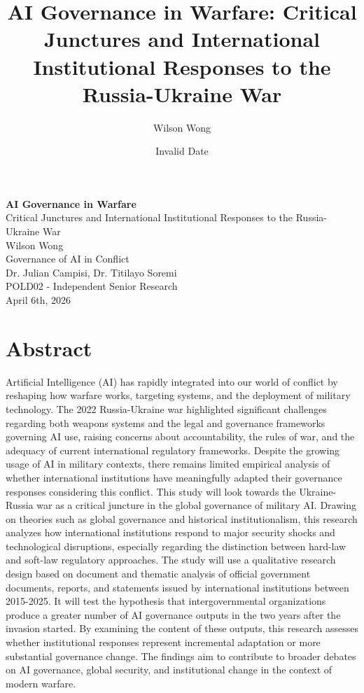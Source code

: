\documentclass[
  12pt,
]{article}
\title{AI Governance in Warfare: Critical Junctures and International
Institutional Responses to the Russia-Ukraine War}
\author{Wilson Wong}
\date{Invalid Date}
\renewcommand*\contentsname{Table of contents}
\newcommand\contentsname{Table of contents}
\begin{document}
\maketitle

\renewcommand*\contentsname{Table of Contents}
{
\hypersetup{linkcolor=}
\setcounter{tocdepth}{3}
\tableofcontents
}
\newpage
\begin{center}
\vspace*{2in}
{\Large\textbf{AI Governance in Warfare}}\\
\vspace{0.5cm}
{\large Critical Junctures and International Institutional Responses to the Russia-Ukraine War}\\
\vspace{1.5cm}
{\large Wilson Wong}\\
\vspace{1cm}
Governance of AI in Conflict\\
Dr. Julian Campisi, Dr. Titilayo Soremi\\
POLD02 - Independent Senior Research\\
\vspace{1cm}
April 6th, 2026
\end{center}
\newpage

\section{Abstract}\label{abstract}

Artificial Intelligence (AI) has rapidly integrated into our world of
conflict by reshaping how warfare works, targeting systems, and the
deployment of military technology. The 2022 Russia-Ukraine war
highlighted significant challenges regarding both weapons systems and
the legal and governance frameworks governing AI use, raising concerns
about accountability, the rules of war, and the adequacy of current
international regulatory frameworks. Despite the growing usage of AI in
military contexts, there remains limited empirical analysis of whether
international institutions have meaningfully adapted their governance
responses considering this conflict. This study will look towards the
Ukraine-Russia war as a critical juncture in the global governance of
military AI. Drawing on theories such as global governance and
historical institutionalism, this research analyzes how international
institutions respond to major security shocks and technological
disruptions, especially regarding the distinction between hard-law and
soft-law regulatory approaches. The study will use a qualitative
research design based on document and thematic analysis of official
government documents, reports, and statements issued by international
institutions between 2015-2025. It will test the hypothesis that
intergovernmental organizations produce a greater number of AI
governance outputs in the two years after the invasion started. By
examining the content of these outputs, this research assesses whether
institutional responses represent incremental adaptation or more
substantial governance change. The findings aim to contribute to broader
debates on AI governance, global security, and institutional change in
the context of modern warfare.
\end{document}
